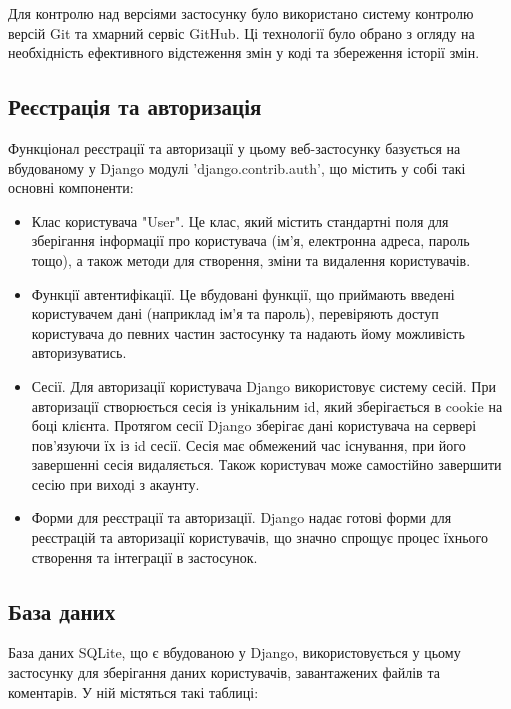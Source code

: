 \documentclass[a4paper,14pt]{extarticle}
\numberwithin{figure}{section}
\begin{document}
    Для контролю над версіями застосунку було використано систему контролю версій Git та хмарний сервіс GitHub. Ці технології було обрано з огляду на необхідність ефективного відстеження змін у коді та збереження історії змін.

    \newpage
    \subsection{\large Реєстрація та авторизація}

    Функціонал реєстрації та авторизації у цьому веб-застосунку базується на вбудованому у Django модулі 'django.contrib.auth', що містить у собі такі основні компоненти:
    \begin{itemize}
    \item Клас користувача "User". Це клас, який містить стандартні поля для зберігання інформації про користувача (ім'я, електронна адреса, пароль тощо), а також методи для створення, зміни та видалення користувачів.
    \item Функції автентифікації. Це вбудовані функції, що приймають введені користувачем дані (наприклад ім'я та пароль), перевіряють доступ користувача до певних частин застосунку та надають йому можливість авторизуватись.
    
    \item Сесії. Для авторизації користувача Django використовує систему сесій. При авторизації створюється сесія із унікальним id, який зберігається в cookie на боці клієнта. Протягом сесії Django зберігає дані користувача на сервері пов'язуючи їх із id сесії. Сесія має обмежений час існування, при його завершенні сесія видаляється. Також користувач може самостійно завершити сесію при виході з акаунту.
    
    \item Форми для реєстрації та авторизації. Django надає готові форми для реєстрацій та авторизації користувачів, що значно спрощує процес їхнього створення та інтеграції в застосунок.
    \end{itemize}

    
    
    \newpage
    \subsection{\large База даних}
    База даних SQLite, що є вбудованою у Django, використовується у цьому застосунку для зберігання даних користувачів, завантажених файлів та коментарів. У ній містяться такі таблиці: 
    
\end{document}

